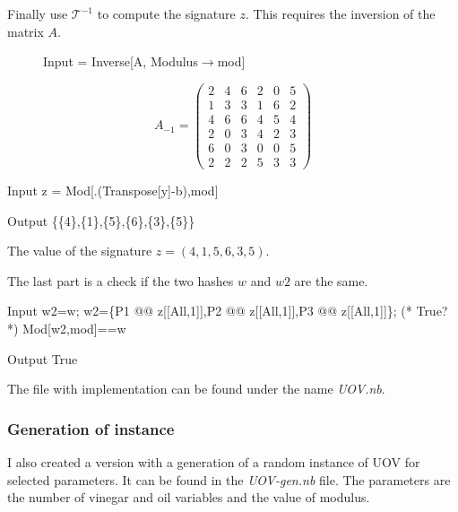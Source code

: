 \documentclass[thesis=M,english]{FITthesis}[2019/12/23]
\begin{document}
\bigskip
\noindent
Finally use $\mathcal{T}^{-1}$ to compute the signature $z$. This requires the inversion of the matrix $A$.
\begin{figure}[h]
\begin{minipage}{0.59\textwidth}
\centering
\begin{mmaCell}[moredefined={A, mod}]{Input}
 = Inverse[A, Modulus\(\pmb{\to}\)mod]
\end{mmaCell}
\end{minipage}
\begin{minipage}{0.28\textwidth}
\centering
\begin{equation*}
A_{-1} =
\begin{pmatrix}
2 & 4 & 6 & 2 & 0 & 5 \\
1 & 3 & 3 & 1 & 6 & 2 \\
4 & 6 & 6 & 4 & 5 & 4 \\
2 & 0 & 3 & 4 & 2 & 3 \\
6 & 0 & 3 & 0 & 0 & 5 \\
2 & 2 & 2 & 5 & 3 & 3
\end{pmatrix}
\end{equation*}
\end{minipage}
\end{figure}
\begin{mmaCell}[moredefined={z, A, y, b, mod}]{Input}
z = Mod[.(Transpose[y]-b),mod]
\end{mmaCell}
\begin{mmaCell}{Output}
\{\{4\},\{1\},\{5\},\{6\},\{3\},\{5\}\}
\end{mmaCell}
The value of the signature $z = (4,1,5,6,3,5)$.

\bigskip
\noindent
The last part is a check if the two hashes $w$ and $w2$ are the same.
\begin{mmaCell}[moredefined={w2, w, P1, z, P2, P3, mod}]{Input}
w2=w;
w2=\{P1 @@ z[[All,1]],P2 @@ z[[All,1]],P3 @@ z[[All,1]]\};
(* True? *)
Mod[w2,mod]==w
\end{mmaCell}
\begin{mmaCell}[addtoindex=2]{Output}
True
\end{mmaCell}
The file with implementation can be found under the name \textit{UOV.nb}.

\subsubsection{Generation of instance}
I also created a version with a generation of a random instance of UOV for selected parameters. It can be found in the \textit{UOV-gen.nb} file. The parameters are the number of vinegar and oil variables and the value of modulus.
\end{document}
